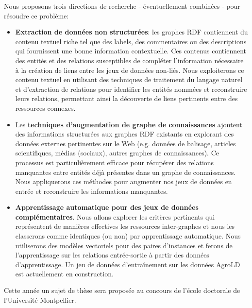Nous proposons trois directions de recherche - éventuellement combinées - pour résoudre ce problème:
\begin{itemize}

\item \textbf{Extraction de données non structurées}: les graphes RDF contiennent du contenu textuel riche tel que des labels, des commentaires ou des descriptions qui fournissent une bonne information contextuelle. Ces contenus contiennent des entités et des relations susceptibles de compléter l'information nécessaire à la création de liens entre les jeux de données non-liés. Nous exploiterons ce contenu textuel en utilisant des techniques de traitement du langage naturel et d'extraction de relations pour identifier les entités nommées et reconstruire leurs relations, permettant ainsi la découverte de liens pertinents entre des ressources connexes.

 \item Les \textbf{techniques d'augmentation de graphe de connaissances} ajoutent des informations structurées aux graphes RDF existants en explorant des données externes pertinentes sur le Web (e.g. données de balisage, articles scientifiques, médias (sociaux), autres graphes de connaissances). Ce processus est particulièrement efficace pour récupérer des relations manquantes entre entités déjà présentes dans un graphe de connaissances. Nous appliquerons ces méthodes pour augmenter nos jeux de données en entrée et reconstruire les informations manquantes.
 
\item \textbf{Apprentissage automatique pour des jeux de données complémentaires}. Nous allons explorer les critères pertinents qui représentent de manières effectives les ressources inter-graphes et nous les classerons comme identiques (ou non) par apprentissage automatique. Nous utiliserons des  modèles vectoriels pour des paires d'instances et ferons de l'apprentissage sur les relations entrée-sortie à partir des données d'apprentissage. Un jeu de données d'entraînement sur les données AgroLD est actuellement en construction.\\

\end{itemize}

Cette année un sujet de thèse sera proposée au concours de l’école doctorale de l’Université Montpellier. \\

